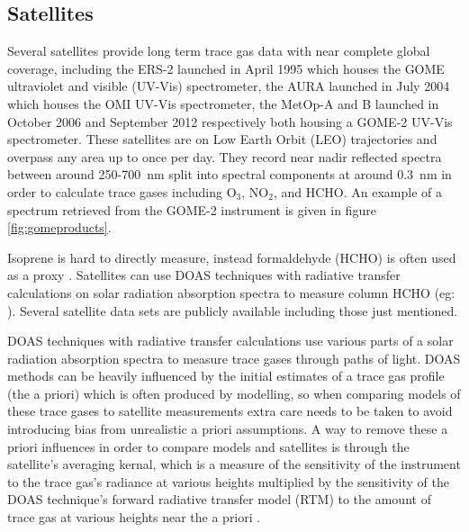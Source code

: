 \subsection{Satellites}
\label{satellites}
Several satellites provide long term trace gas data with near complete global coverage, including the ERS-2 launched in April 1995 which houses the GOME ultraviolet and visible (UV-Vis) spectrometer, the AURA launched in July 2004 which houses the OMI UV-Vis spectrometer, the MetOp-A and B launched in October 2006 and September 2012 respectively both housing a GOME-2 UV-Vis spectrometer.
These satellites are on Low Earth Orbit (LEO) trajectories and overpass any area up to once per day. 
They record near nadir reflected spectra between around 250-700~nm split into spectral components at around $0.3$~nm in order to calculate trace gases including O$_3$, NO$_2$, and HCHO.
An example of a spectrum retrieved from the GOME-2 instrument is given in figure \ref{fig:gomeproducts}.

Isoprene is hard to directly measure, instead formaldehyde (HCHO) is often used as a proxy \cite{Marais_2012,bauwens2013satellite}.
Satellites can use DOAS techniques with radiative transfer calculations on solar radiation absorption spectra to measure column HCHO (eg: \cite{Leue_2001}).
Several satellite data sets are publicly available including those just mentioned.

DOAS techniques with radiative transfer calculations use various parts of a solar radiation absorption spectra to measure trace gases through paths of light.
DOAS methods can be heavily influenced by the initial estimates of a trace gas profile (the a priori) which is often produced by modelling, so when comparing models of these trace gases to satellite measurements extra care needs to be taken to avoid introducing bias from unrealistic a priori assumptions.
A way to remove these a priori influences in order to compare models and satellites is through the satellite's averaging kernal, which is a measure of the sensitivity of the instrument to the trace gas's radiance at various heights multiplied by the sensitivity of the DOAS technique's forward radiative transfer model (RTM) to the amount of trace gas at various heights near the a priori \cite{Eskes_2003}.

